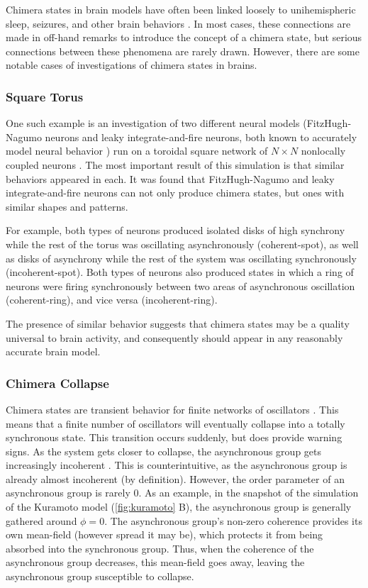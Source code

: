 Chimera states in brain models have often been linked loosely to
unihemispheric sleep,
seizures,
and other brain behaviors \cite{Abrams2008,Panaggio2015,Martens2013,Abrams2004,Shanahan2010,Hohlein2019,Bansal2019,Chouzouris2018}.
In most cases,
these connections are made in off-hand remarks to introduce the concept of a chimera state,
but serious connections between these phenomena are rarely drawn.
However,
there are some notable cases of investigations of chimera states in brains.

\subsubsection{Square Torus}
\label{sec:lit_review_chimera_square_torus}
One such example is an investigation of two different neural models
(FitzHugh-Nagumo neurons and leaky integrate-and-fire neurons, both known to accurately model neural behavior \cite{Deco2008})
run on a toroidal square network of $N \times N$ nonlocally coupled neurons \cite{Schmidt2017}.
The most important result of this simulation is that similar behaviors appeared in each.
It was found that FitzHugh-Nagumo and leaky integrate-and-fire neurons can not only produce chimera states,
but ones with similar shapes and patterns.

For example,
both types of neurons produced isolated disks of high synchrony while the rest of the torus was oscillating asynchronously (coherent-spot),
as well as disks of asynchrony while the rest of the system was oscillating synchronously (incoherent-spot).
Both types of neurons also produced states in which a ring of neurons were firing synchronously
between two areas of asynchronous oscillation (coherent-ring),
and vice versa (incoherent-ring).

The presence of similar behavior suggests that chimera states may be a quality universal to brain activity,
and consequently should appear in any reasonably accurate brain model.

\subsubsection{Chimera Collapse}
\label{sec:lit_review_chimera_collapse}
Chimera states are transient behavior for finite networks of oscillators \cite{Wolfrum2011}.
This means that a finite number of oscillators will eventually collapse into a totally synchronous state.
This transition occurs suddenly, but does provide warning signs.
As the system gets closer to collapse, the asynchronous group gets increasingly incoherent \cite{Andrzejak2016}.
This is counterintuitive, as the asynchronous group is already almost incoherent (by definition).
However, the order parameter of an asynchronous group is rarely 0.
As an example, in the snapshot of the simulation of the Kuramoto model (\cref{fig:kuramoto} B), the asynchronous group is generally gathered around $\phi = 0$.
The asynchronous group's non-zero coherence provides its own mean-field (however spread it may be), which protects it from being absorbed into the synchronous group.
Thus, when the coherence of the asynchronous group decreases, this mean-field goes away, leaving the asynchronous group susceptible to collapse.

